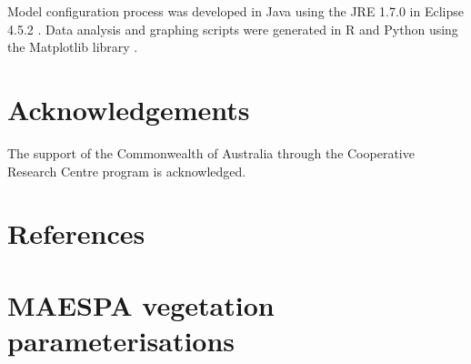 \documentclass[final,3p,times,authoryear]{elsarticle}
\begin{document}
Model configuration process was developed in Java using the JRE 1.7.0 \citep{Oracle2016} in Eclipse 4.5.2 \citep{Eclipse2016}. Data analysis and graphing scripts were generated in R \citep{R2013} and Python \citep{Python2016} using the Matplotlib library \citep{Hunter2007}. 

\section*{Acknowledgements}
The support of the Commonwealth of Australia through the Cooperative Research Centre program is acknowledged.

\section*{References}\label{sec:ref}
   
  


\begin{thebibliography}{00}


\bibitem[ ()]{}

\end{thebibliography}


\appendix
\setcounter{table}{0}
\renewcommand{\thetable}{A\arabic{table}}



\section{MAESPA vegetation parameterisations}\label{sec:maespavegpara}  
%
\end{document}
